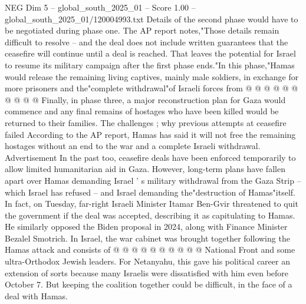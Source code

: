 \begin{textsample}{NEG Dim 5 – global\_south\_2025\_01 – Score 1.00 – global\_south\_2025\_01/120004993.txt}
Details of the second phase would have to be negotiated during phase one.
The AP report notes,"Those details remain difficult to resolve -- and the deal does not include written guarantees that the ceasefire will continue until a deal is reached.
That leaves the potential for Israel to resume its military campaign after the first phase ends."In this phase,"Hamas would release the remaining living captives, mainly male soldiers, in exchange for more prisoners and the"complete withdrawal"of Israeli forces from @ @ @ @ @ @ @ @ @ @ Finally, in phase three, a major reconstruction plan for Gaza would commence and any final remains of hostages who have been killed would be returned to their families.
The challenges ; why previous attempts at ceasefire failed According to the AP report, Hamas has said it will not free the remaining hostages without an end to the war and a complete Israeli withdrawal.
Advertisement In the past too, ceasefire deals have been enforced temporarily to allow limited humanitarian aid in Gaza.
However, long-term plans have fallen apart over Hamas demanding Israel ' s military withdrawal from the Gaza Strip -- which Israel has refused -- and Israel demanding the"destruction of Hamas"itself.
In fact, on Tuesday, far-right Israeli Minister Itamar Ben-Gvir threatened to quit the government if the deal was accepted, describing it as capitulating to Hamas.
He similarly opposed the Biden proposal in 2024, along with Finance Minister Bezalel Smotrich.
In Israel, the war cabinet was brought together following the Hamas attack and consists of @ @ @ @ @ @ @ @ @ @ National Front and some ultra-Orthodox Jewish leaders.
For Netanyahu, this gave his political career an extension of sorts because many Israelis were dissatisfied with him even before October 7.
But keeping the coalition together could be difficult, in the face of a deal with Hamas.

\end{textsample}
